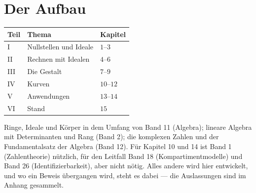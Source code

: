 \section*{Der Aufbau}

\begin{merksatz}
\begin{center}
{\small
\renewcommand{\arraystretch}{1.5}
\begin{tabular}{@{}P{1.4cm}P{3.6cm}P{3.0cm}@{}}
\toprule
\textbf{Teil} & \textbf{Thema} & \textbf{Kapitel}\\
\midrule
I & Nullstellen und Ideale & $1$--$3$\\
II & Rechnen mit Idealen & $4$--$6$\\
III & Die Gestalt & $7$--$9$\\
IV & Kurven & $10$--$12$\\
V & Anwendungen & $13$--$14$\\
VI & Stand & $15$\\
\bottomrule
\end{tabular}}
\end{center}

Ringe, Ideale und Körper in dem Umfang von Band 11 (Algebra); lineare Algebra mit Determinanten und Rang (Band 2); die komplexen Zahlen und der Fundamentalsatz der Algebra (Band 12). Für Kapitel 10 und 14 ist Band 1 (Zahlentheorie) nützlich, für den Leitfall Band 18 (Kompartimentmodelle) und Band 26 (Identifizierbarkeit), aber nicht nötig. Alles andere wird hier entwickelt, und wo ein Beweis übergangen wird, steht es dabei --- die Auslassungen sind im Anhang gesammelt.

\begin{center}
\begin{minipage}{0.88\textwidth}
\end{minipage}
\end{center}
\end{merksatz}
